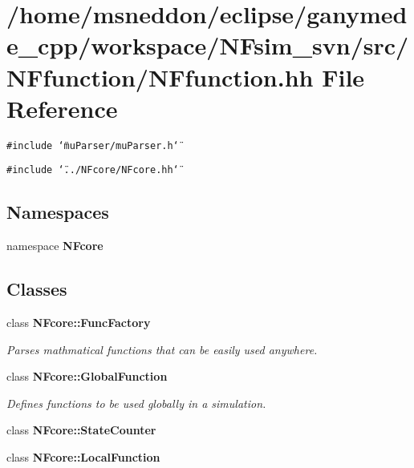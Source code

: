 \section{/home/msneddon/eclipse/ganymede\_\-cpp/workspace/NFsim\_\-svn/src/NFfunction/NFfunction.hh File Reference}
\label{NFfunction_8hh}


{\tt \#include \char`\"{}muParser/muParser.h\char`\"{}}\par
{\tt \#include \char`\"{}../NFcore/NFcore.hh\char`\"{}}\par
\subsection*{Namespaces}
\begin{CompactItemize}
\item 
namespace {\bf NFcore}
\end{CompactItemize}
\subsection*{Classes}
\begin{CompactItemize}
\item 
class {\bf NFcore::FuncFactory}
\begin{CompactList}\small\item\em Parses mathmatical functions that can be easily used anywhere. \item\end{CompactList}\item 
class {\bf NFcore::GlobalFunction}
\begin{CompactList}\small\item\em Defines functions to be used globally in a simulation. \item\end{CompactList}\item 
class {\bf NFcore::StateCounter}
\item 
class {\bf NFcore::LocalFunction}
\end{CompactItemize}
